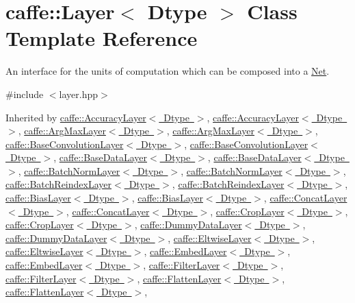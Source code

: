 \hypertarget{classcaffe_1_1_layer}{}\section{caffe\+:\+:Layer$<$ Dtype $>$ Class Template Reference}
\label{classcaffe_1_1_layer}


An interface for the units of computation which can be composed into a \mbox{\hyperlink{classcaffe_1_1_net}{Net}}.  




{\ttfamily \#include $<$layer.\+hpp$>$}



Inherited by \mbox{\hyperlink{classcaffe_1_1_accuracy_layer}{caffe\+::\+Accuracy\+Layer$<$ Dtype $>$}}, \mbox{\hyperlink{classcaffe_1_1_accuracy_layer}{caffe\+::\+Accuracy\+Layer$<$ Dtype $>$}}, \mbox{\hyperlink{classcaffe_1_1_arg_max_layer}{caffe\+::\+Arg\+Max\+Layer$<$ Dtype $>$}}, \mbox{\hyperlink{classcaffe_1_1_arg_max_layer}{caffe\+::\+Arg\+Max\+Layer$<$ Dtype $>$}}, \mbox{\hyperlink{classcaffe_1_1_base_convolution_layer}{caffe\+::\+Base\+Convolution\+Layer$<$ Dtype $>$}}, \mbox{\hyperlink{classcaffe_1_1_base_convolution_layer}{caffe\+::\+Base\+Convolution\+Layer$<$ Dtype $>$}}, \mbox{\hyperlink{classcaffe_1_1_base_data_layer}{caffe\+::\+Base\+Data\+Layer$<$ Dtype $>$}}, \mbox{\hyperlink{classcaffe_1_1_base_data_layer}{caffe\+::\+Base\+Data\+Layer$<$ Dtype $>$}}, \mbox{\hyperlink{classcaffe_1_1_batch_norm_layer}{caffe\+::\+Batch\+Norm\+Layer$<$ Dtype $>$}}, \mbox{\hyperlink{classcaffe_1_1_batch_norm_layer}{caffe\+::\+Batch\+Norm\+Layer$<$ Dtype $>$}}, \mbox{\hyperlink{classcaffe_1_1_batch_reindex_layer}{caffe\+::\+Batch\+Reindex\+Layer$<$ Dtype $>$}}, \mbox{\hyperlink{classcaffe_1_1_batch_reindex_layer}{caffe\+::\+Batch\+Reindex\+Layer$<$ Dtype $>$}}, \mbox{\hyperlink{classcaffe_1_1_bias_layer}{caffe\+::\+Bias\+Layer$<$ Dtype $>$}}, \mbox{\hyperlink{classcaffe_1_1_bias_layer}{caffe\+::\+Bias\+Layer$<$ Dtype $>$}}, \mbox{\hyperlink{classcaffe_1_1_concat_layer}{caffe\+::\+Concat\+Layer$<$ Dtype $>$}}, \mbox{\hyperlink{classcaffe_1_1_concat_layer}{caffe\+::\+Concat\+Layer$<$ Dtype $>$}}, \mbox{\hyperlink{classcaffe_1_1_crop_layer}{caffe\+::\+Crop\+Layer$<$ Dtype $>$}}, \mbox{\hyperlink{classcaffe_1_1_crop_layer}{caffe\+::\+Crop\+Layer$<$ Dtype $>$}}, \mbox{\hyperlink{classcaffe_1_1_dummy_data_layer}{caffe\+::\+Dummy\+Data\+Layer$<$ Dtype $>$}}, \mbox{\hyperlink{classcaffe_1_1_dummy_data_layer}{caffe\+::\+Dummy\+Data\+Layer$<$ Dtype $>$}}, \mbox{\hyperlink{classcaffe_1_1_eltwise_layer}{caffe\+::\+Eltwise\+Layer$<$ Dtype $>$}}, \mbox{\hyperlink{classcaffe_1_1_eltwise_layer}{caffe\+::\+Eltwise\+Layer$<$ Dtype $>$}}, \mbox{\hyperlink{classcaffe_1_1_embed_layer}{caffe\+::\+Embed\+Layer$<$ Dtype $>$}}, \mbox{\hyperlink{classcaffe_1_1_embed_layer}{caffe\+::\+Embed\+Layer$<$ Dtype $>$}}, \mbox{\hyperlink{classcaffe_1_1_filter_layer}{caffe\+::\+Filter\+Layer$<$ Dtype $>$}}, \mbox{\hyperlink{classcaffe_1_1_filter_layer}{caffe\+::\+Filter\+Layer$<$ Dtype $>$}}, \mbox{\hyperlink{classcaffe_1_1_flatten_layer}{caffe\+::\+Flatten\+Layer$<$ Dtype $>$}}, \mbox{\hyperlink{classcaffe_1_1_flatten_layer}{caffe\+::\+Flatten\+Layer$<$ Dtype $>$}}, 